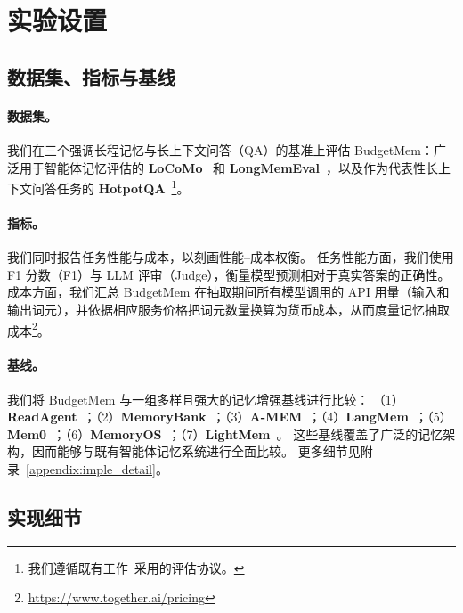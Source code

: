 \section{实验设置}
\label{sec:exp}



\subsection{数据集、指标与基线}
\label{sec:datasets_metrics_baselines}

\paragraph{数据集。}
我们在三个强调长程记忆与长上下文问答（QA）的基准上评估 BudgetMem：广泛用于智能体记忆评估的 \textbf{LoCoMo}~\citep{maharana2024evaluating-locomo} 和 \textbf{LongMemEval}~\citep{wu2024longmemeval}，以及作为代表性长上下文问答任务的 \textbf{HotpotQA}~\citep{yang2018hotpotqa}\footnote{我们遵循既有工作~\citep{yu2025memagent}采用的评估协议。}。

\paragraph{指标。}
我们同时报告任务性能与成本，以刻画性能--成本权衡。
任务性能方面，我们使用 F1 分数（F1）与 LLM 评审（Judge），衡量模型预测相对于真实答案的正确性。
成本方面，我们汇总 BudgetMem 在抽取期间所有模型调用的 API 用量（输入和输出词元），并依据相应服务价格把词元数量换算为货币成本，从而度量记忆抽取成本\footnote{\url{https://www.together.ai/pricing}}。

\paragraph{基线。}
我们将 BudgetMem 与一组多样且强大的记忆增强基线进行比较：
（1）\textbf{ReadAgent}~\citep{lee2024human}；（2）\textbf{MemoryBank}~\citep{zhong2024memorybank}；（3）\textbf{A-MEM}~\citep{xu2025mem}；（4）\textbf{LangMem}~\citep{LangMem}；（5）\textbf{Mem0}~\citep{chhikara2025mem0}；（6）\textbf{MemoryOS}~\citep{kang2025memory}；（7）\textbf{LightMem}~\citep{fang2025lightmem}。
这些基线覆盖了广泛的记忆架构，因而能够与既有智能体记忆系统进行全面比较。
更多细节见附录~\ref{appendix:imple_detail}。

\subsection{实现细节}
\label{sec:impl_details}

